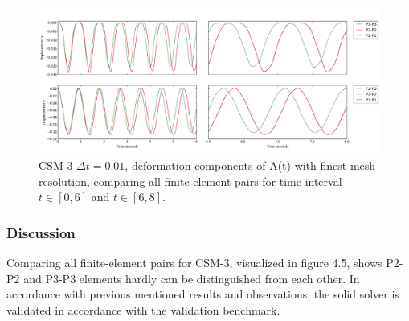\begin{figure}[h!]
  \centering
    \includegraphics[scale=0.34]{./Fig/csm3compare.png}
      \caption{CSM-3 $\Delta t = 0.01$, deformation components of A(t) with finest mesh resolution, comparing all finite element pairs for time interval $t \in [0, 6]$  and $t \in [6, 8]$.}
       \label{fig:csm3c}
\end{figure}

\subsubsection*{Discussion}
 
 Comparing all finite-element pairs for CSM-3, visualized in figure 4.5, shows P2-P2 and P3-P3 elements hardly can be distinguished from each other. In accordance with previous mentioned results and observations, the solid solver is validated in accordance with the validation benchmark.
 

